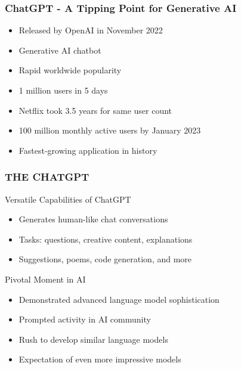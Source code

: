 \begin{frame}[fragile]\frametitle{ChatGPT - A Tipping Point for Generative AI}
    \begin{itemize}
        \item Released by OpenAI in November 2022
        \item Generative AI chatbot
        \item Rapid worldwide popularity
        \item 1 million users in 5 days
        \item Netflix took 3.5 years for same user count
        \item 100 million monthly active users by January 2023
        \item Fastest-growing application in history
    \end{itemize}
\end{frame}

\begin{frame}[fragile]\frametitle{THE CHATGPT}
Versatile Capabilities of ChatGPT

    \begin{itemize}
        \item Generates human-like chat conversations
        \item Tasks: questions, creative content, explanations
        \item Suggestions, poems, code generation, and more
    \end{itemize}
	
Pivotal Moment in AI

    \begin{itemize}
        \item Demonstrated advanced language model sophistication
        \item Prompted activity in AI community
        \item Rush to develop similar language models
        \item Expectation of even more impressive models
    \end{itemize}
\end{frame}

